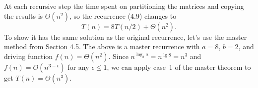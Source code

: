 At each recursive step the time spent on partitioning the matrices and copying the results is $\Theta(n^2)$, so the recurrence (4.9) changes to
\[
    T(n) = 8T(n/2)+\Theta(n^2).
\]
To show it has the same solution as the original recurrence, let's use the master method from Section 4.5.
The above is a master recurrence with $a=8$, $b=2$, and driving function $f(n)=\Theta(n^2)$.
Since $n^{\log_ba}=n^{\lg8}=n^3$ and $f(n)=O(n^{3-\epsilon})$ for any $\epsilon\le1$, we can apply case~1 of the master theorem to get $T(n)=\Theta(n^3)$.
